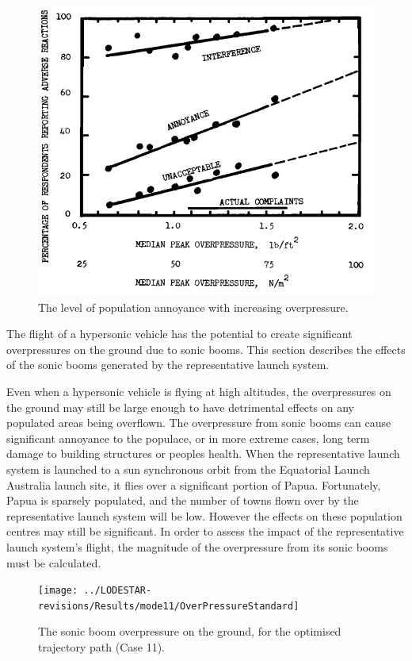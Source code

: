 \begin{figure}[ht]
	\centering
	\includegraphics[width=0.6\linewidth]{figures/6_FlyBack/OverPressureResponse}
	\caption{The level of population annoyance with increasing overpressure.}
	\label{fig:OverPressureResponse}
\end{figure}

The flight of a hypersonic vehicle has the potential to create significant overpressures on the ground due to sonic booms. This section describes the effects of the sonic booms generated by the representative launch system. 

Even when a hypersonic vehicle is flying at high altitudes, the overpressures on the ground may still be large enough to have detrimental effects on any populated areas being overflown. The overpressure from sonic booms can cause significant annoyance to the populace, or in more extreme cases, long term damage to building structures or peoples health. 
When the representative launch system is launched to a sun synchronous orbit from the Equatorial Launch Australia launch site, it flies over a significant portion of Papua. Fortunately, Papua is sparsely populated, and the number of towns flown over by the representative launch system will be low. However the effects on these population centres may still be significant. In order to assess the impact of the representative launch system's flight, the magnitude of the overpressure from its sonic booms must be calculated. 
\begin{figure}[ht]
	\centering
	\texttt{[image: ../LODESTAR-revisions/Results/mode11/OverPressureStandard]}
	\caption{The sonic boom overpressure on the ground, for the optimised trajectory path (Case 11).}
	\label{fig:OverPressureStandard}
\end{figure}

